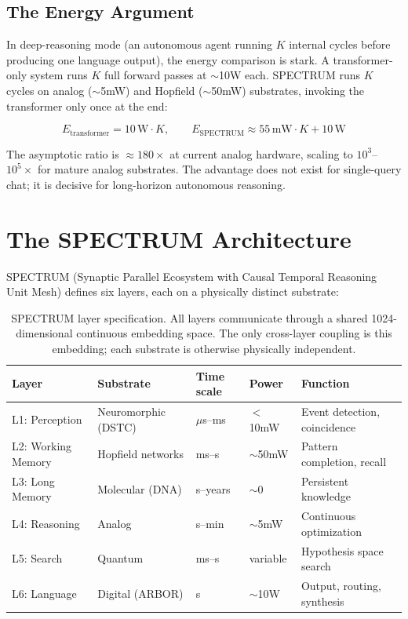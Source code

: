 \documentclass[12pt]{article}
\begin{document}
\subsection{The Energy Argument}

In deep-reasoning mode (an autonomous agent running $K$ internal cycles before producing one language output), the energy comparison is stark. A transformer-only system runs $K$ full forward passes at $\sim$10W each. SPECTRUM runs $K$ cycles on analog ($\sim$5mW) and Hopfield ($\sim$50mW) substrates, invoking the transformer only once at the end:

\[
E_{\text{transformer}} = 10\,\text{W} \cdot K, \qquad
E_{\text{SPECTRUM}} \approx 55\,\text{mW} \cdot K + 10\,\text{W}
\]

\noindent The asymptotic ratio is $\approx 180\times$ at current analog hardware, scaling to $10^3$--$10^5\times$ for mature analog substrates. The advantage does not exist for single-query chat; it is decisive for long-horizon autonomous reasoning.

\section{The SPECTRUM Architecture}
\label{sec:spectrum}

SPECTRUM (Synaptic Parallel Ecosystem with Causal Temporal Reasoning Unit Mesh) defines six layers, each on a physically distinct substrate:

\begin{table}[H]
\centering
\small
\begin{tabular}{lllll}
\toprule
\textbf{Layer} & \textbf{Substrate} & \textbf{Time scale} & \textbf{Power} & \textbf{Function} \\
\midrule
L1: Perception     & Neuromorphic (DSTC) & $\mu$s--ms  & $<$10mW  & Event detection, coincidence \\
L2: Working Memory & Hopfield networks   & ms--s       & $\sim$50mW & Pattern completion, recall \\
L3: Long Memory    & Molecular (DNA)     & s--years    & $\sim$0   & Persistent knowledge \\
L4: Reasoning      & Analog              & s--min      & $\sim$5mW  & Continuous optimization \\
L5: Search         & Quantum             & ms--s       & variable  & Hypothesis space search \\
L6: Language       & Digital (ARBOR)     & s           & $\sim$10W  & Output, routing, synthesis \\
\bottomrule
\end{tabular}
\caption{SPECTRUM layer specification. All layers communicate through a shared 1024-dimensional continuous embedding space. The only cross-layer coupling is this embedding; each substrate is otherwise physically independent.}
\label{tab:layers}
\end{table}
\end{document}
